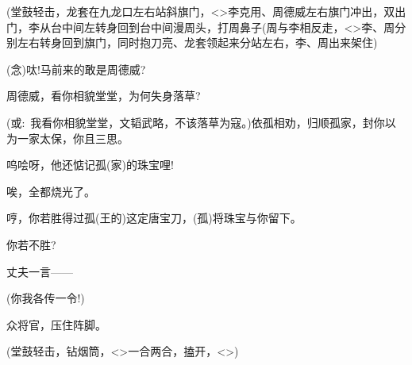 {



\vspace{5pt}

({\hwfs 堂鼓轻击}，龙套{\hwfs 在九龙口左右站斜旗门}，\textless{}\!\textgreater{}李克用、周德威{\hwfs 左右旗门冲出}，{\hwfs 双出门}，李{\hwfs 从台中间左转身回到台中间漫}周{\hwfs 头}，{\hwl 打}周{\hwl 鼻子}(周{\hwfs 与}李{\hwfs 相反走}，\textless{}\!\textgreater{}李、周{\hwfs 分别左右转身回到旗门}，{\hwfs 同时抱刀亮}、龙套{\hwfs 领起来分站左右}，李、周{\hwfs 出来架住})

({\akai 念})呔!马前来的敢是周德威?

周德威，看你相貌堂堂，为何失身落草?

({\akai 或}:~我看你相貌堂堂，文韬武略，不该落草为寇。)依孤相劝，归顺孤家，封你以为一家太保，你且三思。

呜哙呀，他还惦记孤(家)的珠宝哩!

唉，全都烧光了。

哼，你若胜得过孤(王的)这定唐宝刀，(孤)将珠宝与你留下。

你若不胜?\hspace{10pt}~

丈夫一言------

(你我各传一令!)

众将官，压住阵脚。


({\hwfs 堂鼓轻击}，{\hwl 钻烟筒}，\textless{}\!\textgreater{}{\hwl 一合两合}，{\hwfs 搕开}，\textless{}\!\textgreater{})


}
